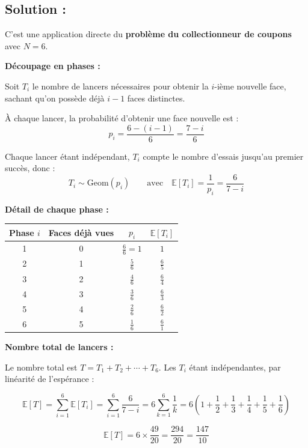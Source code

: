\subsection*{Solution :}

C'est une application directe du \textbf{problème du collectionneur de coupons} avec $N = 6$.

\bigskip

\textbf{Découpage en phases :}

Soit $T_i$ le nombre de lancers nécessaires pour obtenir la $i$-ième nouvelle face, sachant qu'on possède déjà $i-1$ faces distinctes.

À chaque lancer, la probabilité d'obtenir une face nouvelle est :
\[
p_i = \frac{6 - (i-1)}{6} = \frac{7 - i}{6}
\]

Chaque lancer étant indépendant, $T_i$ compte le nombre d'essais jusqu'au premier succès, donc :
\[
T_i \sim \mathrm{Geom}(p_i) \qquad \text{avec} \quad \mathbb{E}[T_i] = \frac{1}{p_i} = \frac{6}{7-i}
\]

\bigskip

\textbf{Détail de chaque phase :}

\begin{center}
\renewcommand{\arraystretch}{1.5}
\begin{tabular}{c|c|c|c}
Phase $i$ & Faces déjà vues & $p_i$ & $\mathbb{E}[T_i]$ \\
\hline
1 & 0 & $\frac{6}{6} = 1$ & $1$ \\
2 & 1 & $\frac{5}{6}$ & $\frac{6}{5}$ \\
3 & 2 & $\frac{4}{6}$ & $\frac{6}{4}$ \\
4 & 3 & $\frac{3}{6}$ & $\frac{6}{3}$ \\
5 & 4 & $\frac{2}{6}$ & $\frac{6}{2}$ \\
6 & 5 & $\frac{1}{6}$ & $\frac{6}{1}$ \\
\end{tabular}
\end{center}

\bigskip

\textbf{Nombre total de lancers :}

Le nombre total est $T = T_1 + T_2 + \cdots + T_6$. Les $T_i$ étant indépendantes, par linéarité de l'espérance :

\[
\mathbb{E}[T] = \sum_{i=1}^{6} \mathbb{E}[T_i] = \sum_{i=1}^{6} \frac{6}{7-i} = 6\sum_{k=1}^{6} \frac{1}{k} = 6\left(1 + \frac{1}{2} + \frac{1}{3} + \frac{1}{4} + \frac{1}{5} + \frac{1}{6}\right)
\]

\[
\mathbb{E}[T] = 6 \times \frac{49}{20} = \frac{294}{20} = \frac{147}{10}
\]

